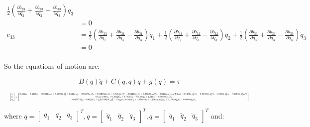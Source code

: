 \begin{align*}
\frac{1}{2}\left(\frac{\partial b_{23}}{\partial q_3}+\frac{\partial b_{23}}{\partial q_3}-\frac{\partial b_{33}}{\partial q_2}\right)\dot q_3\\
&=0\\
c_{33}&=
\frac{1}{2}\left(\frac{\partial b_{33}}{\partial q_1}+\frac{\partial b_{31}}{\partial q_3}-\frac{\partial b_{31}}{\partial q_3}\right)\dot q_1+
\frac{1}{2}\left(\frac{\partial b_{33}}{\partial q_2}+\frac{\partial b_{32}}{\partial q_3}-\frac{\partial b_{32}}{\partial q_3}\right)\dot q_2+
\frac{1}{2}\left(\frac{\partial b_{33}}{\partial q_3}+\frac{\partial b_{33}}{\partial q_3}-\frac{\partial b_{33}}{\partial q_3}\right)\dot q_3\\
&=0\\
\end{align*}

\newpage

So the equations of motion are:

\begin{equation*}
B(q)\ddot q+C(q,\dot q)\dot q+g(q)=\tau
\end{equation*}

\begin{equation*}
\resizebox{\textwidth}{!}{$
\begin{bmatrix}
\tau_1\\\tau_2\\\tau_3
\end{bmatrix}=
\begin{bmatrix}
0.496\ddot q_1 - 0.6196\ddot q_2 + 0.7099\ddot q_1q_2 + 0.7099\dot q_1\dot q_2^2 + 1.549\ddot q_1q_2^2 + 0.05885\ddot q_1C_3 + 0.03923d\dot q_3S_3 + 0.0474\ddot q_1C_3^2 + 0.03923\dot q_3^3C_3 + 0.1962\ddot q_1q_2C_3 - 0.0474\dot q_1\dot q_3^2sin(2.0q_3) + 0.1962\dot q_1\dot q_2^2C_3 - 0.05885\dot q_1\dot q_3^2S_3 + 3.098\dot q_1\dot q_2^2q_2 - 0.1962\dot q_1\dot q_3^2q_2S_3\\ 0.5\dot q_2(3.098q_2 + 0.1962C_3 + 0.7099)\dot q_1^2 - 0.6196\ddot q_1 + 1.549\ddot q_2 - 0.09808d\dot q_3S_3\\ 0.04757d\dot q_3 + 0.9621C_3 + \dot q_1(0.03923C_3\dot q_3^2 - 0.5\dot q_1(0.0948S_3C_3 + 0.05885S_3 + 0.1962q_2S_3)\dot q_3) + 0.03923\ddot q_1S_3 - 0.09808\ddot q_2S_3 \end{bmatrix}$}
\end{equation*}

where $q = \begin{bmatrix}
q_1&q_2&q_3
\end{bmatrix}^T, \dot q = \begin{bmatrix}
\dot q_1&\dot q_2&\dot q_3
\end{bmatrix}^T, \ddot q = \begin{bmatrix}
\ddot q_1&\ddot q_2&\ddot q_3
\end{bmatrix}^T$ and:

